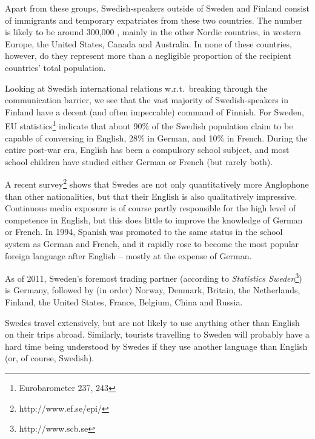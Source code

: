 \begin{multicols}{2}
Apart from these groups, Swedish-speakers outside of Sweden and
Finland consist of immigrants and temporary expatriates from these two
countries. The number is likely to be around 300,000
\cite{parkvall2010}, mainly in the other Nordic countries, in western
Europe, the United States, Canada and Australia. In none of these
countries, however, do they represent more than a negligible
proportion of the recipient countries' total population.

Looking at Swedish international relations w.r.t.\, breaking through the
communication barrier, we see that the vast majority of
Swedish-speakers in Finland have a decent (and often impeccable)
command of Finnish. For Sweden, EU statistics\footnote{Eurobarometer
  237, 243} indicate that about 90\% of the Swedish population claim
to be capable of conversing in English, 28\% in German, and 10\% in
French. During the entire post-war era, English has been a compulsory
school subject, and most school children have studied either German or
French (but rarely both). 


A recent survey\footnote{http://www.ef.se/epi/} shows that Swedes are not only
quantitatively more Anglophone than other nationalities, but that
their English is also qualitatively impressive. Continuous media
exposure is of course partly responsible for the high level of
competence in English, but this does little to improve the knowledge
of German or French. In 1994, Spanish was promoted to the same status
in the school system as German and French, and it rapidly rose to
become the most popular foreign language after English -- mostly at the
expense of German.

As of 2011, Sweden's foremost trading partner (according to
\textit{Statistics Sweden}\footnote{http://www.scb.se}) is Germany,
followed by (in order) Norway, Denmark, Britain, the Netherlands,
Finland, the United States, France, Belgium, China and Russia.

Swedes travel extensively, but are not likely to use anything other
than English on their trips abroad.  Similarly, tourists travelling to
Sweden will probably have a hard time being understood by Swedes if
they use another language than English (or, of course, Swedish).


\end{multicols}
